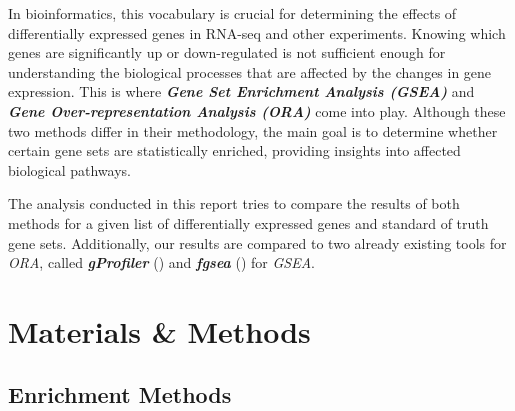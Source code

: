 \documentclass[12pt]{article}
\begin{document}
In bioinformatics, this vocabulary is crucial for determining the effects of differentially
expressed genes in RNA-seq and other experiments. Knowing which genes are significantly
up or down-regulated is not sufficient enough for understanding the biological processes
that are affected by the changes in gene expression. This is where \textit{\textbf{Gene
Set Enrichment Analysis (GSEA)}} and \textit{\textbf{Gene Over-representation Analysis
(ORA)}} come into play. Although these two methods differ in their methodology, the
main goal is to determine whether certain gene sets are statistically enriched, providing insights into affected biological pathways.

The analysis conducted in this report tries to compare the results of both methods
for a given list of differentially expressed genes and standard of truth gene sets.
Additionally, our results are compared to two already existing tools for \textit{ORA}, called
\textit{\textbf{gProfiler}} (\cite{gprofiler}) and \textit{\textbf{fgsea}} (\cite{fgsea})
for \textit{GSEA}.

\section{Materials \& Methods}
\subsection{Enrichment Methods}\label{sec:Enrichment-Methods}
\end{document}
